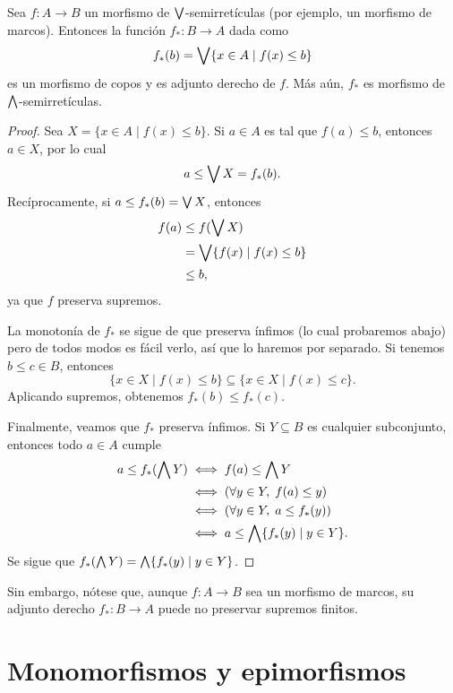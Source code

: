 \begin{lemma}
    Sea $f:A\to B$ un morfismo de $\bigvee$-semirretículas
    (por ejemplo, un morfismo de marcos).
    Entonces la función $f_*:B\to A$ dada como
    \[
        f_*(b) = \bigvee\{x\in A \mid f(x)\leq b\} 
    \]
    es un morfismo de copos y es adjunto derecho de $f$.
    Más aún, $f_*$ es morfismo de $\bigwedge$-semirretículas.
\end{lemma}
\begin{proof}
    Sea $X=\{x\in A\mid f(x)\leq b\}$.
    Si $a\in A$ es tal que $f(a)\leq b$, entonces $a\in X$,
    por lo cual
    \[
        a\leq \bigvee X= f_*(b)
    .\]
    Recíprocamente, si $a\leq f_*(b)=\bigvee X$, entonces
    \begin{align*}
        f(a)
        &\leq f(\bigvee X) \\
        &= \bigvee\{f(x)\mid f(x)\leq b\} \\
        &\leq b,
    \end{align*}
    ya que $f$ preserva supremos.

    La monotonía de $f_*$ se sigue de que preserva ínfimos (lo
    cual probaremos abajo) pero de todos modos es fácil verlo,
    así que lo haremos por separado.
    Si tenemos $b\leq c\in B$, entonces
    \[
        \{x\in X\mid f(x)\leq b\} \subseteq
        \{x\in X\mid f(x)\leq c\}.
    \]
    Aplicando supremos, obtenemos $f_*(b)\leq f_*(c)$.
    
    Finalmente, veamos que $f_*$ preserva ínfimos.
    Si $Y\subseteq B$ es cualquier subconjunto,
    entonces todo $a\in A$ cumple
    \begin{align*}
        a\leq f_*(\bigwedge Y)
        &\iff f(a)\leq \bigwedge Y \\
        &\iff (\forall y\in Y,\; f(a)\leq y) \\
        &\iff (\forall y\in Y,\; a\leq f_*(y)) \\
        &\iff a\leq \bigwedge\{f_*(y) \mid y\in Y\}.
    \end{align*}
    Se sigue que $f_*(\bigwedge Y)=\bigwedge\{f_*(y)\mid y\in Y\}$.
\end{proof}

Sin embargo, nótese que, aunque $f:A\to B$ sea un morfismo
de marcos, su adjunto derecho $f_*:B\to A$
puede no preservar supremos finitos.







\section{Monomorfismos y epimorfismos}

